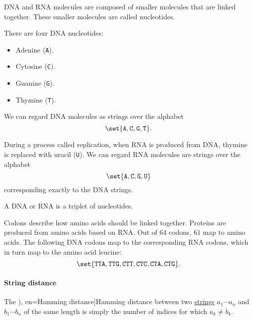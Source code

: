 \begin{example}
\begin{thmenum}
     DNA and RNA molecules are composed of smaller molecules that are linked together. These smaller molecules are called nucleotides.

    There are four DNA nucleotides:
    \begin{itemize}
      \item Adenine (\texttt{A}).
      \item Cytosine (\texttt{C}).
      \item Guanine (\texttt{G}).
      \item Thymine (\texttt{T}).
    \end{itemize}

    We can regard DNA molecules as strings over the alphabet
    \begin{equation*}
      \set{ \texttt{A}, \texttt{C}, \texttt{G}, \texttt{T} }.
    \end{equation*}

    During a process called replication, when RNA is produced from DNA, thymine is replaced with uracil (\texttt{U}). We can regard RNA molecules are strings over the alphabet
    \begin{equation*}
      \set{ \texttt{A}, \texttt{C}, \texttt{G}, \texttt{U} }
    \end{equation*}
    corresponding exactly to the DNA strings.

    A DNA or RNA  is a triplet of nucleotides.

    Codons describe how amino acids should be linked together. Proteins are produced from amino acids based on RNA. Out of \( 64 \) codons, \( 61 \) map to amino acids. The following DNA codons map to the corresponding RNA codons, which in turn map to the amino acid leucine:
    \begin{equation*}
       \set{ \texttt{TTA}, \texttt{TTG}, \texttt{CTT}, \texttt{CTC}, \texttt{CTA}, \texttt{CTG} }.
    \end{equation*}
  \end{thmenum}
\end{example}

\paragraph{String distance}

\begin{definition}\label{def:hamming_distance}
  The \term[ru=расстояние Хэмминга (\cite[\S 6.3.3]{Новиков2013ДискретнаяМатематика}), en=Hamming distance]{Hamming distance} between two \hyperref[def:formal_language/string]{strings} \( a_1 \cdots a_n \) and \( b_1 \cdots b_n \) of the same length is simply the number of indices for which \( a_k \neq b_k \).
\end{definition}

